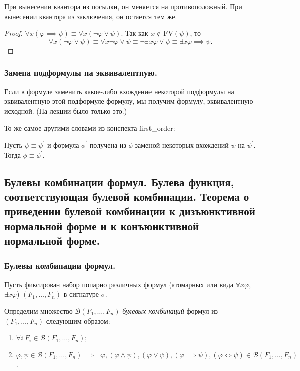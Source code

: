 \documentclass[a4paper, fleqn]{article}
\begin{document}
    При вынесении квантора из посылки, он меняется на противоположный.
    При вынесении квантора из заключения, он остается тем же.
    
    \begin{proof}
        $\forall x (\varphi \implies \psi) \equiv \forall x (\neg \varphi \lor \psi)$.
        Так как $x \notin \text{FV}(\psi)$, то
        \[
            \forall x (\neg \varphi \lor \psi) \equiv \forall x \neg \varphi \lor 
            \psi \equiv \neg \exists x \varphi \lor \psi \equiv \exists x \varphi 
            \implies \psi.
        \]
    \end{proof}

    \subsubsection{Замена подформулы на эквивалентную.}

    Если в формуле заменить какое-либо вхождение некоторой подформулы на 
    эквивалентную этой подформуле формулу, мы получим формулу, эквивалентную исходной.
    (На лекции было только это.)
    
    То же самое другими словами из конспекта first\_order:

    \begin{lemma}
        Пусть $\psi \equiv \psi^\prime$ и формула $\phi^\prime$ получена из $\phi$ 
        заменой некоторых вхождений $\psi$ на $\psi^\prime$. Тогда $\phi \equiv \phi^\prime$.
    \end{lemma}

    \subsection{Булевы комбинации формул. Булева функция, соответствующая булевой комбинации. Теорема о приведении булевой комбинации к дизъюнктивной нормальной форме и к конъюнктивной нормальной форме.}

    \subsubsection{Булевы комбинации формул.}

    Пусть фиксирован набор попарно различных формул (атомарных или вида 
    $\forall x \varphi$, $\exists x \varphi$) $(F_{1}, \ldots, F_{n})$ в 
    сигнатуре $\sigma$.
    \begin{definition}
        Определим множество $\mathcal{B}(F_{1}, \ldots, F_{n})$ {\it булевых комбинаций}
         формул из $(F_{1}, \ldots, F_{n})$ следующим образом:
        \begin{enumerate}
            \item $\forall i~F_{i} \in \mathcal{B}(F_{1}, \ldots, F_{n})$;
            \item $\varphi, \psi \in \mathcal{B}(F_{1}, \ldots, F_{n}) \implies \neg 
            \varphi, (\varphi \land \psi), (\varphi \lor \psi), (\varphi \implies \psi), 
            (\varphi \iff \psi) \in \mathcal{B}(F_{1}, \ldots, F_{n})$.
        \end{enumerate}
    \end{definition}
    
\end{document}
